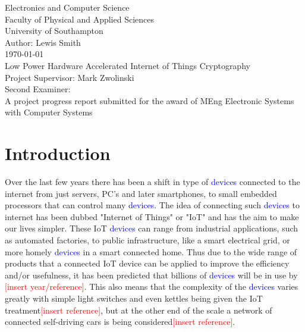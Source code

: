 \documentclass[12pt,twoside,a4paper]{report}
\begin{document}
    
    \begin{titlepage}
    \begin{center}
        \Huge
        Electronics and Computer Science
        \\Faculty of Physical and Applied Sciences
        \\University of Southampton
        \Large
        \\[4cm]Author: Lewis Smith
        \\[1cm]\today
        \Huge
        \\[2cm]Low Power Hardware Accelerated Internet of Things Cryptography
        \large
        \\[4cm]Project Supervisor: Mark Zwolinski
        \\Second Examiner:
        \\[4cm]A project progress report submitted for the award of MEng Electronic Systems with Computer Systems
        
    \end{center}
    \end{titlepage}
    
    \begin{abstract}
    
    \lipsum[1-2]
    
    \end{abstract}
    
    \tableofcontents
    
    \chapter{Introduction}
    Over the last few years there has been a shift in type of \textcolor{blue}{devices} connected to the internet from just servers, PC's and later smartphones, to small embedded processors that can control many \textcolor{blue}{devices}. The idea of connecting such \textcolor{blue}{devices} to internet has been dubbed "Internet of Things" or "IoT" and has the aim to make our lives simpler. These IoT \textcolor{blue}{devices} can range from industrial applications, such as automated factories, to public infrastructure, like a smart electrical grid, or more homely \textcolor{blue}{devices} in a smart connected home. Thus due to the wide range of products that a connected IoT device can be applied to improve the efficiency and/or usefulness, it has been predicted that billions of \textcolor{blue}{devices} will be in use by \textcolor{red}{[insert year/reference]}. This also means that the complexity of the \textcolor{blue}{devices} varies greatly with simple light switches and even kettles being given the IoT treatment\textcolor{red}{[insert reference]}, but at the other end of the scale a network of connected self-driving cars is being considered\textcolor{red}{[insert reference]}.
    
\end{document}
